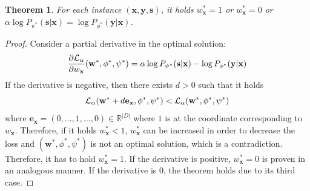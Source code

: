 \documentclass[preprint,12pt]{elsarticle}
\newtheorem{theorem}{Theorem}
\begin{document}
\begin{theorem}
	For each instance $(\mathbf{x},\mathbf{y},\mathbf{s})$, it holds
	$w_{\mathbf{x}}^*= 1$ or $w_{\mathbf{x}}^*= 0$ or $\alpha\log P_{\psi^*}(\mathbf{s}|\mathbf{x})=\log P_{\phi^*}(\mathbf{y}|\mathbf{x})$.
	\label{pp:anypoint}
\end{theorem}

\begin{proof}
	Consider a partial derivative in the optimal solution:
	\begin{equation}
	\frac{\partial{\cal L}_\alpha}{\partial w_\mathbf{x}}(\mathbf{w}^*,\phi^*,\psi^*)=\alpha\log P_{\psi^*}(\mathbf{s}|\mathbf{x})-\log P_{\phi^*}(\mathbf{y}|\mathbf{x})
	\end{equation}
	If the derivative is negative, then there exists $d>0$ such that it holds
	\begin{equation}{\cal L}_\alpha(\mathbf{w}^*+d\mathbf{e}_{\mathbf{x}},\phi^*,\psi^*) < {\cal L}_\alpha(\mathbf{w}^*,\phi^*,\psi^*)
	\end{equation}
	where $\mathbf{e}_\mathbf{x}=(0,\ldots,1,\ldots,0)\in\mathbb{R}^{|D|}$ where $1$ is at the coordinate corresponding to $w_\mathbf{x}$.
	Therefore, if it holds $w_\mathbf{x}^*< 1$, $w_\mathbf{x}^*$ can be increased in order to decrease the loss and $(\mathbf{w}^*,\phi^*,\psi^*)$ is not an optimal solution, which is a contradiction. Therefore, it has to hold $w_\mathbf{x}^*=1$.
	If the derivative is positive, $w_\mathbf{x}^*=0$ is proven in an analogous manner.
	If the derivative is $0$, the theorem holds due to its third case.
\end{proof}
\end{document}
